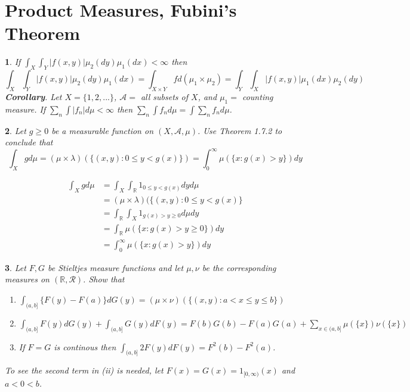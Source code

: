 \documentclass{report}
\newtheorem{ex}{}[section]
\begin{document}
\section{Product Measures, Fubini's Theorem}
\begin{ex}
If $\int_X\int_Y |f(x,y)|\mu_2(dy)\mu_1(dx) < \infty$ then
\[\int_X\int_Y |f(x,y)|\mu_2(dy)\mu_1(dx) = \int_{X\times Y}fd(\mu_1 \times \mu_2) =\int_Y\int_X |f(x,y)|\mu_1(dx)\mu_2(dy)\]
{\bf{Corollary}}. Let $X = \{1,2,...\}$, $\mathcal{A} = $ all subsets of $X$, and $\mu_1 = $ counting measure. If $\sum_n\int |f_n|d\mu < \infty$ then $\sum_n \int f_nd\mu = \int\sum_n f_nd\mu$.
\end{ex}
\begin{ex}
Let $g \ge 0$ be a measurable function on $(X,\mathcal{A},\mu)$. Use Theorem 1.7.2 to conclude that
\[\int_X gd\mu = (\mu \times \lambda)(\{(x,y) : 0 \le y < g(x)\}) = \int_0^\infty \mu(\{x : g(x) > y\})dy\]
\end{ex}
\begin{align*}
    \int_X gd\mu &= \int_X\int_\mathbb{R} 1_{0 \le y < g(x)}dyd\mu\\
    &= (\mu \times \lambda) (\{(x,y) : 0 \le y < g(x)\}\\
    &= \int_\mathbb{R}\int_X 1_{g(x) > y \ge 0}d\mu dy\\
    &= \int_\mathbb{R} \mu(\{x : g(x) > y \ge 0\})dy\\
    &= \int_0^\infty \mu(\{x : g(x) > y\})dy
\end{align*}
\begin{ex}
Let  $F, G$ be Stieltjes measure functions and let $\mu, \nu$ be the corresponding measures on $(\mathbb{R}, \mathcal{R})$. Show that
\begin{enumerate}
    \item[(i)] $\int_{(a,b]} \{F(y) - F(a)\}dG(y) = (\mu\times\nu)(\{(x,y):a<x\le y\le b\})$
    \item[(ii)] $\int_{(a,b]}F(y)dG(y) + \int_{(a,b]}G(y)dF(y) = F(b)G(b) - F(a)G(a) + \sum_{x\in(a,b]}\mu(\{x\})\nu(\{x\})$
    \item[(iii)] If $F =G$ is continous then $\int_{(a,b]}2F(y)dF(y) = F^2(b) - F^2(a)$.
\end{enumerate}
To see the second term in (ii) is needed, let $F(x) = G(x) = 1_{[0,\infty)}(x)$ and $a < 0 < b$.
\end{ex}
\end{document}
